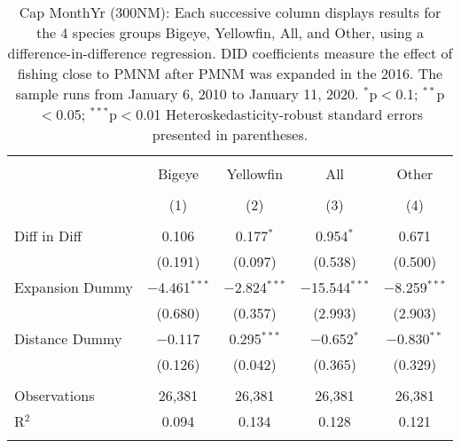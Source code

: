 
\begin{table}[!htbp] \centering 
  \caption{Cap MonthYr (300NM): Each successive column displays results for the 4 species groups Bigeye, Yellowfin, All, and Other, using a difference-in-difference regression. DID coefficients measure the effect of fishing close to PMNM after PMNM was expanded in the 2016. The sample runs from January 6, 2010 to January 11, 2020. $^{*}$p$<$0.1; $^{**}$p$<$0.05; $^{***}$p$<$0.01 Heteroskedasticity-robust standard errors presented in parentheses.} 
  \label{tbl:timeFE300NM} 
\begin{tabular}{@{\extracolsep{5pt}}lcccc} 
\\[-1.8ex]\hline 
\hline \\[-1.8ex] 
 & Bigeye & Yellowfin & All & Other \\ 
\\[-1.8ex] & (1) & (2) & (3) & (4)\\ 
\hline \\[-1.8ex] 
 Diff in Diff & 0.106 & 0.177$^{*}$ & 0.954$^{*}$ & 0.671 \\ 
  & (0.191) & (0.097) & (0.538) & (0.500) \\ 
  Expansion Dummy & $-$4.461$^{***}$ & $-$2.824$^{***}$ & $-$15.544$^{***}$ & $-$8.259$^{***}$ \\ 
  & (0.680) & (0.357) & (2.993) & (2.903) \\ 
  Distance Dummy & $-$0.117 & 0.295$^{***}$ & $-$0.652$^{*}$ & $-$0.830$^{**}$ \\ 
  & (0.126) & (0.042) & (0.365) & (0.329) \\ 
 \hline \\[-1.8ex] 
Observations & 26,381 & 26,381 & 26,381 & 26,381 \\ 
R$^{2}$ & 0.094 & 0.134 & 0.128 & 0.121 \\ 
\hline 
\hline \\[-1.8ex] 
\end{tabular} 
\end{table} 
